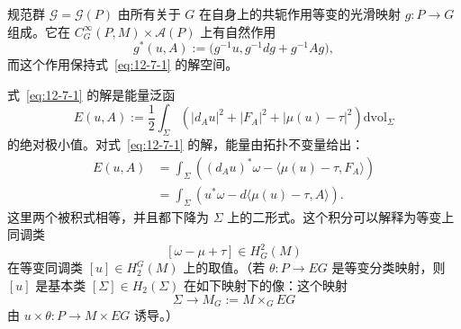 规范群 $\mathcal G=\mathcal G(P)$ 由所有关于 $G$ 在自身上的共轭作用等变的光滑映射
$g:P\to G$ 组成。它在 $C_G^\infty(P,M)\times\mathcal A(P)$ 上有自然作用
\[
  g^*(u,A):=\bigl(g^{-1}u,g^{-1}dg+g^{-1}Ag\bigr),
\]
而这个作用保持式~\eqref{eq:12-7-1} 的解空间。

式~\eqref{eq:12-7-1} 的解是能量泛函
\[
  E(u,A):=\frac12\int_\Sigma
  \left(|d_Au|^2+|F_A|^2+|\mu(u)-\tau|^2\right)
  \mathrm{dvol}_\Sigma
\]
的绝对极小值。对式~\eqref{eq:12-7-1} 的解，能量由拓扑不变量给出：
\[
\begin{aligned}
  E(u,A)
  &=\int_\Sigma\left((d_Au)^*\omega
  -\langle\mu(u)-\tau,F_A\rangle\right)\\
  &=\int_\Sigma\left(u^*\omega
  -d\langle\mu(u)-\tau,A\rangle\right).
\end{aligned}
\]
这里两个被积式相等，并且都下降为 $\Sigma$ 上的二形式。这个积分可以解释为等变上同调类
\[
  [\omega-\mu+\tau]\in H_G^2(M)
\]
在等变同调类 $[u]\in H_2^G(M)$ 上的取值。（若 $\theta:P\to EG$ 是等变分类映射，则
$[u]$ 是基本类 $[\Sigma]\in H_2(\Sigma)$ 在如下映射下的像：这个映射
\[
  \Sigma\longrightarrow M_G:=M\times_GEG
\]
由 $u\times\theta:P\to M\times EG$ 诱导。）

